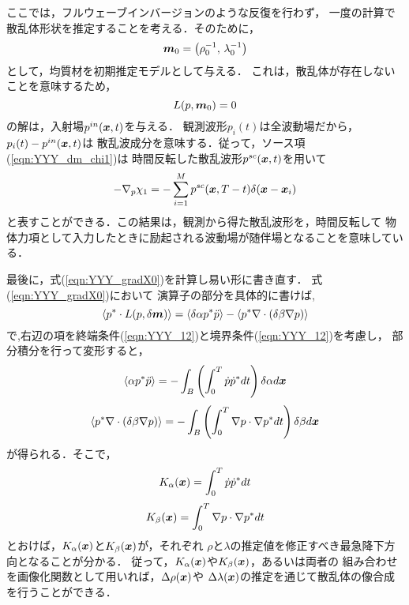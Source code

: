 ここでは，フルウェーブインバージョンのような反復を行わず，
一度の計算で散乱体形状を推定することを考える．そのために，
\begin{equation}
	\mbox{\boldmath $m$}_0=\left(\rho_0^{-1},\, \lambda_0^{-1} \right)
	\label{eqn:YYY_16}
\end{equation}
として，均質材を初期推定モデルとして与える．
これは，散乱体が存在しないことを意味するため，
\begin{equation}
	L(p,\mbox{\boldmath $m$}_0)=0
	\label{eqn:}
\end{equation}
の解は，入射場$p^{in}(\mbox{\boldmath $x$},t)$を与える．
観測波形$p_i(t)$は全波動場だから，$p_i(t)-p^{in}(\mbox{\boldmath $x$},t)$は
散乱波成分を意味する．従って，ソース項(\ref{eqn:YYY_dm_chi1})は
時間反転した散乱波形$p^{sc}(\mbox{\boldmath $x$},t)$を用いて
\begin{equation}
	-\nabla_p\chi_1 = 
	-\sum_{i=1}^M p^{sc}(\mbox{\boldmath $x$},T-t)\delta(\mbox{\boldmath $x$}-\mbox{\boldmath $x$}_i)
	\label{eqn:YYY_17}
\end{equation}
と表すことができる．この結果は，観測から得た散乱波形を，時間反転して
物体力項として入力したときに励起される波動場が随伴場となることを意味している．

最後に，式(\ref{eqn:YYY_gradX0})を計算し易い形に書き直す．
式(\ref{eqn:YYY_gradX0})において
演算子の部分を具体的に書けば,
\begin{equation}
	\left< p^*  \cdot L(p,\delta \mbox{\boldmath $m$}) \right> 
	=
	\left< \delta \alpha p^*  \ddot{p} \right> 
	-
	\left< p^*  \nabla\cdot \left( \delta \beta \nabla p \right)\right> 
	\label{eqn:YYY_18}
\end{equation}
で,右辺の項を終端条件(\ref{eqn:YYY_12})と境界条件(\ref{eqn:YYY_12})を考慮し，
部分積分を行って変形すると，
\begin{equation}
	\left< \alpha p^*  \ddot{p} \right> 
	=-\int_B \left( \int_0^T \dot{p}\dot{p}^* dt \right) \delta \alpha  d\mbox{\boldmath $x$}
	\label{eqn:YYY_19}
\end{equation}
\begin{equation}
	\left< p^*  \nabla\cdot \left( \delta \beta \nabla p \right)\right> 
	=
	-
	\int_B \left( \int_0^T \nabla p\cdot \nabla p^* dt \right) \delta \beta  d\mbox{\boldmath $x$}
	\label{eqn:YYY_20}
\end{equation}
が得られる．そこで，
\begin{equation}
	K_\alpha(\mbox{\boldmath $x$})=\int_0^T \dot{p}\dot{p}^* dt 
	\label{eqn:YYY_Ka}
\end{equation}
\begin{equation}
	K_\beta(\mbox{\boldmath $x$})=\int_0^T \nabla p\cdot \nabla p^* dt 
	\label{eqn:YYY_Kb}
\end{equation}
とおけば，$K_\alpha(\mbox{\boldmath $x$})$と$K_\beta(\mbox{\boldmath $x$})$が，それぞれ
$\rho$と$\lambda$の推定値を修正すべき最急降下方向となることが分かる．
従って，$K_\alpha(\mbox{\boldmath $x$})$や$K_\beta(\mbox{\boldmath $x$})$，あるいは両者の
組み合わせを画像化関数として用いれば，$\Delta \rho(\mbox{\boldmath $x$})$や
$\Delta \lambda(\mbox{\boldmath $x$})$の推定を通じて散乱体の像合成を行うことができる．

